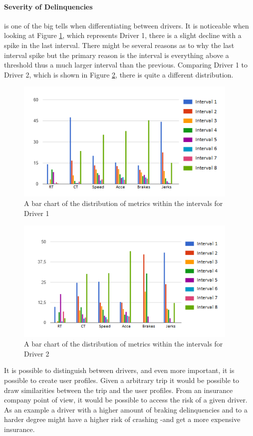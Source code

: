 \paragraph{Severity of Delinquencies} is one of the big tells when differentiating between drivers. It is noticeable when looking at Figure \ref{fig:car8intervals}, which represents Driver 1, there is a slight decline with a spike in the last interval. There might be several reasons as to why the last interval spike but the primary reason is the interval is everything above a threshold thus a much larger interval than the previous. Comparing Driver 1 to Driver 2, which is shown in Figure \ref{fig:car21intervals}, there is quite a different distribution.

\begin{figure}[tb]
\centering
\includegraphics[width=0.95\textwidth]{Pictures/car8intervals}
\caption{A bar chart of the distribution of metrics within the intervals for Driver 1}
\label{fig:car8intervals}
\end{figure}

\begin{figure}[tb]
\centering
\includegraphics[width=0.95\textwidth]{Pictures/car21intervals}
\caption{A bar chart of the distribution of metrics within the intervals for Driver 2}
\label{fig:car21intervals}
\end{figure}

It is possible to distinguish between drivers, and even more important, it is possible to create user profiles. Given a arbitrary trip it would be possible to draw similarities between the trip and the user profiles. From an insurance company point of view, it would be possible to access the risk of a given driver. As an example a driver with a higher amount of braking delinquencies and to a harder degree might have a higher risk of crashing -and get a more expensive insurance.